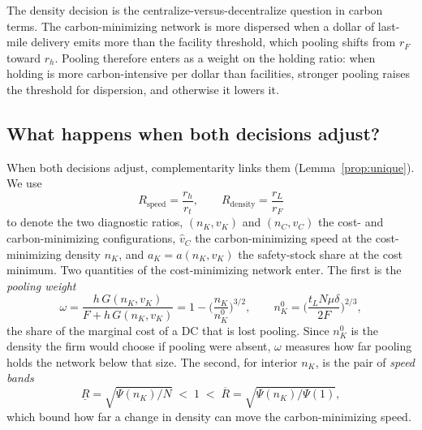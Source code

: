 \documentclass[11pt]{article}
\numberwithin{proposition}{section}
\theoremstyle{definition}
\theoremstyle{remark}
\theoremstyle{plain}
\begin{document}
\noindent The density decision is the centralize-versus-decentralize question in carbon terms. The
carbon-minimizing network is more dispersed when a dollar of last-mile delivery emits more than the facility
threshold, which pooling shifts from $r_F$ toward $r_h$. Pooling therefore enters as a weight on the holding
ratio: when holding is more carbon-intensive per dollar than facilities, stronger pooling raises the threshold for
dispersion, and otherwise it lowers it.  

\subsection{What happens when both decisions adjust?}\label{sec:joint}

When both decisions adjust, complementarity links them (Lemma~\ref{prop:unique}). We use
\[
  R_{\mathrm{speed}}=\frac{r_h}{r_t},\qquad R_{\mathrm{density}}=\frac{r_L}{r_F}
\]
to denote the two diagnostic ratios, $(n_K,v_K)$ and $(n_C,v_C)$ the cost- and carbon-minimizing configurations,
$\hat v_C$ the carbon-minimizing speed at the cost-minimizing density $n_K$, and $a_K=a(n_K,v_K)$ the
safety-stock share at the cost minimum. Two quantities of the cost-minimizing network enter. The first is the
\emph{pooling weight}
\begin{equation}\label{eq:poolweight}
  \omega=\frac{h\,G(n_K,v_K)}{F+h\,G(n_K,v_K)}=1-\Big(\frac{n_K}{n_K^0}\Big)^{3/2},
  \qquad n_K^0=\Big(\frac{t_LN\mu\delta}{2F}\Big)^{2/3},
\end{equation}
the share of the marginal cost of a DC that is lost pooling. Since $n_K^0$ is the density the
firm would choose if pooling were absent, $\omega$ measures how far pooling holds the network below that size.
The second, for interior $n_K$, is the pair of \emph{speed bands}
\begin{equation}\label{eq:speedbands}
  \underline R=\sqrt{\Psi(n_K)/N}\;<\;1\;<\;\overline R=\sqrt{\Psi(n_K)/\Psi(1)},
\end{equation}
which bound how far a change in density can move the carbon-minimizing speed.
\end{document}
